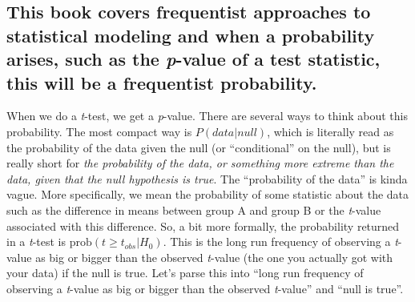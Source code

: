 \documentclass[]{book}
\begin{document}
\hypertarget{this-book-covers-frequentist-approaches-to-statistical-modeling-and-when-a-probability-arises-such-as-the-p-value-of-a-test-statistic-this-will-be-a-frequentist-probability.}{%
\subsection{\texorpdfstring{This book covers frequentist approaches to statistical modeling and when a probability arises, such as the \emph{p}-value of a test statistic, this will be a frequentist probability.}{This book covers frequentist approaches to statistical modeling and when a probability arises, such as the p-value of a test statistic, this will be a frequentist probability.}}\label{this-book-covers-frequentist-approaches-to-statistical-modeling-and-when-a-probability-arises-such-as-the-p-value-of-a-test-statistic-this-will-be-a-frequentist-probability.}}

When we do a \emph{t}-test, we get a \emph{p}-value. There are several ways to think about this probability. The most compact way is \(P(data | null)\), which is literally read as the probability of the data given the null (or ``conditional'' on the null), but is really short for \emph{the probability of the data, or something more extreme than the data, given that the null hypothesis is true}. The ``probability of the data'' is kinda vague. More specifically, we mean the probability of some statistic about the data such as the difference in means between group A and group B or the \emph{t}-value associated with this difference. So, a bit more formally, the probability returned in a \emph{t}-test is \(\mathrm{prob}(t \ge t_{obs} | H_0)\). This is the long run frequency of observing a \emph{t}-value as big or bigger than the observed \emph{t}-value (the one you actually got with your data) if the null is true. Let's parse this into ``long run frequency of observing a \emph{t}-value as big or bigger than the observed \emph{t}-value'' and ``null is true''.
\end{document}
